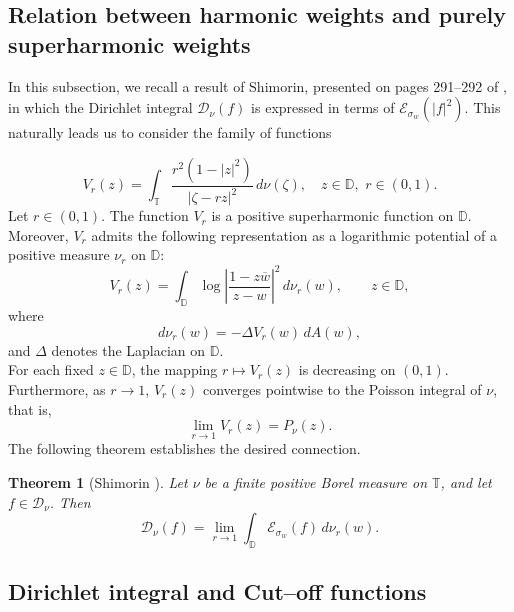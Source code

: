 \documentclass[12pt,reqno,a4paper]{amsart}
\newtheorem{theo}[prop]{Theorem}
\newcommand\DD{\mathbb{D}}
\newcommand{\cD}{{\mathcal{D}}}
\numberwithin{equation}{section}
\begin{document}
\subsection{Relation between harmonic weights and purely superharmonic weights}
%
In this subsection, we recall a result of Shimorin, presented on pages 291--292 of \cite{Shi2}, in which the Dirichlet integral \( \mathcal{D}_\nu(f) \) is expressed in terms of \( \mathcal{E}_{\sigma_w}(|f|^2) \). This naturally leads us to consider the family of functions

\[
V_r(z) = \int_{\mathbb{T}} \frac{r^2(1 - |z|^2)}{|\zeta - rz|^2} \, d\nu(\zeta), \quad z\in\DD,\,\, r \in (0, 1).
\]
%
Let \( r \in (0,1) \). The function \( V_r \) is a positive superharmonic function on \( \mathbb{D} \). Moreover, \( V_r \) admits the following representation as a logarithmic potential of a positive measure \( \nu_r \) on \( \mathbb{D} \):
\[
V_r(z) = \int_{\mathbb{D}} \log \left| \frac{1 - z \overline{w}}{z - w} \right|^2 \, d\nu_r(w), \qquad z \in \mathbb{D},
\]
where
\[
d\nu_r(w) = -\Delta V_r(w)\, dA(w),
\]
and \( \Delta \) denotes the Laplacian on \( \mathbb{D} \).\\
For each fixed \( z \in \mathbb{D} \), the mapping \( r \mapsto V_r(z) \) is decreasing on \( (0,1) \). Furthermore, as \( r \to 1 \), \( V_r(z) \) converges pointwise to the Poisson integral of \( \nu \), that is,
\[
\lim_{r \to 1} V_r(z) = {P_\nu}(z).
\]
The following theorem establishes the desired connection.
\begin{theo}[Shimorin \cite{Shi2}]\label{Shimorin}
	Let $\nu$ be a finite positive Borel measure on $\mathbb{T}$, and let \( f \in \mathcal{D}_\nu \). Then
	\[
	\mathcal{D}_\nu(f)
	= \lim_{r \to 1} \int_{\mathbb{D}} \mathcal{E}_{\sigma_w}(f)\, d\nu_r(w).
	\]
\end{theo}

\subsection{Dirichlet integral and Cut--off functions}\label{Cut--off functions}
\end{document}

